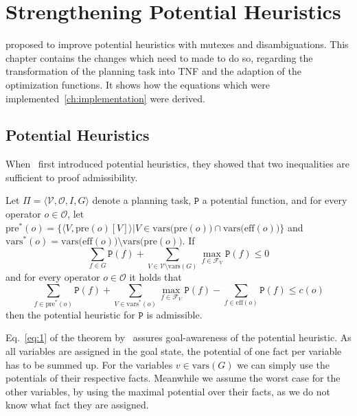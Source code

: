 
\chapter{Strengthening Potential Heuristics}\label{ch:strengthening-potential-heuristics}

\citeauthor{fivser2020strengthening} proposed to improve potential heuristics with mutexes and disambiguations.
This chapter contains the changes which need to made to do so, regarding the transformation of the planning task into TNF and the adaption of the optimization functions.
It shows how the equations which were implemented~\ref{ch:implementation} were derived.

\section{Potential Heuristics}\label{sec:potential-heuristics}

When~\citeauthor{pommerening2015non} first introduced potential heuristics, they showed that two inequalities are sufficient to proof admissibility.

\begin{theorem}
    \label{theorem:theorem 5} %
    Let $\Pi = \langle \mathcal{V}, \mathcal{O}, I, G \rangle$ denote a planning task, $\mathtt{P}$ a
    potential function, and for every operator $o\in\mathcal{O}$, let
    $\mathrm{pre}^*(o)=\{\langle V, \mathrm{pre}(o)[V]\rangle |V\in \mathrm{vars(pre}(o))\cap\mathrm{vars(eff}(o))\}$ and
    $\mathrm{vars}^*(o)=\mathrm{vars(eff}(o))\setminus\mathrm{vars(pre}(o))$. If
    \[\sum_{f\in G}\mathtt{P}(f)+\sum_{V\in\mathcal{V}\setminus\mathrm{vars}(G)}\max_{f\in\mathcal{F}_V}\mathtt{P}(f)\leq0\label{eq:1}\tag{1}\]
    and for every operator $o\in\mathcal{O}$ it holds that
    \[\sum_{f\in\mathrm{pre}^*(o)}\mathtt{P}(f)+\sum_{V\in\mathrm{vars}^*(o)}\max_{f\in\mathcal{F}_V}\mathtt{P}(f)-\sum_{f\in\mathrm{eff}(o)}\mathtt{P}(f)\leq c(o)\label{eq:2}\tag{2}\]
    then the potential heuristic for $\mathtt{P}$ is admissible.
\end{theorem}


Eq.~\eqref{eq:1} of the theorem by~\citeauthor{fivser2020strengthening} assures goal-awareness of the potential heuristic.
As all variables are assigned in the goal state, the potential of one fact per variable has to be summed up.
For the variables $v\in\text{vars}(G)$ we can simply use the potentials of their respective facts.
Meanwhile we assume the worst case for the other variables, by using the maximal potential over their facts, as we do not know what fact they are assigned.

